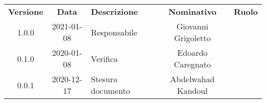 {
    \renewcommand{\arraystretch}{1.5}
    \centering
    \begin{longtable}{ c c  C{4cm}  c  c }
        \rowcolor{\primaryColor}
        \textcolor{\secondaryColor}{
        \textbf{Versione}}     & \textcolor{\secondaryColor}{\textbf{Data}}       & \textcolor{\secondaryColor}
        {\textbf{Descrizione}} & \textcolor{\secondaryColor}{\textbf{Nominativo}} & \textcolor{\secondaryColor}{\textbf{Ruolo}}                          \\


        1.0.0                  & 2021-01-08                                       & Responsabile                                & Giovanni Grigoletto & \responsabile{} \\
        0.1.0                 & 2020-01-08                                      & Verifica                                   	 & Edoardo Caregnato & \verificatore{} \\
        0.0.1                  & 2020-12-17						 & Stesura documento 		& Abdelwahad Kandoul & \redattore{}    \\
    \end{longtable}
}